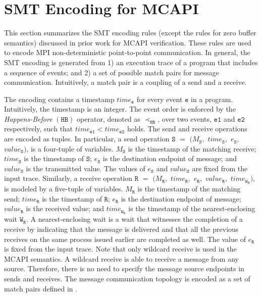 \section{SMT Encoding for MCAPI}
This section summarizes the SMT encoding rules (except the rules for zero buffer semantics) discussed in prior work for MCAPI verification. These rules are used to encode MPI non-deterministic point-to-point communication. In general, the SMT encoding is generated from 1) an execution trace of a program that includes a sequence of events; and 2) a set of possible match pairs for message communication. Intuitively, a match pair is a coupling of a send and a receive. 


The encoding contains a timestamp $\mathit{time}_\mathtt{e}$ for every event $\mathtt{e}$ in a program. Intuitively, the timestamp is an integer.  The event order is enforced by the \emph{Happens-Before} $(\mathtt{HB})$ operator, denoted as
$\mathrm{\prec_\mathtt{HB}}$, over two events, $\mathtt{e1}$ and $\mathtt{e2}$ respectively, such that $\mathit{time}_\mathtt{e1} <  \mathit{time}_\mathtt{e2}$ holds. The send and receive operations are encoded as tuples. In particular, a send operation $\mathtt{S}$ $=$ $(M_\mathtt{S},$ $\mathit{time}_\mathtt{S},$ $e_\mathtt{S},$ $\mathit{value}_\mathtt{S})$, is a four-tuple of variables. $M_\mathtt{S}$ is the timestamp of the matching receive; $\mathit{time}_\mathtt{S}$ is the timestamp of $\mathtt{S}$; $e_\mathtt{S}$ is the destination endpoint of message; and $\mathit{value}_\mathtt{S}$ is the transmitted value. The values of $e_\mathtt{S}$ and $\mathit{value}_\mathtt{S}$ are fixed from the input trace. Similarly, a receive operation $\mathtt{R}$ $=$ $(M_\mathtt{R},$ $\mathit{time}_\mathtt{R},$ $e_\mathtt{R},$ $\mathit{value}_\mathtt{R},$ $\mathit{time}_{\mathtt{W}_\mathtt{R}})$, is modeled by a five-tuple of variables. $M_\mathtt{R}$ is the timestamp of the matching send; $\mathit{time}_\mathtt{R}$ is the timestamp of $\mathtt{R}$; $e_\mathtt{R}$ is the destination endpoint of message; $\mathit{value}_\mathtt{R}$ is the received value; and $\mathit{time}_{\mathtt{W}_\mathtt{R}}$ is the timestamp of the nearest-enclosing wait ${\mathtt{W}_\mathtt{R}}$. A nearest-enclosing wait is a wait that witnesses the completion of a receive by indicating that the message is delivered and that all the previous receives on the same process issued earlier are completed as well. The value of $e_\mathtt{R}$ is fixed from the input trace. Note that only wildcard receive is used in the MCAPI semantics. A wildcard receive is able to receive a message from any source. Therefore, there is no need to specify the message source endpoints in sends and receives. The message communication topology is encoded as a set of match pairs defined in .

